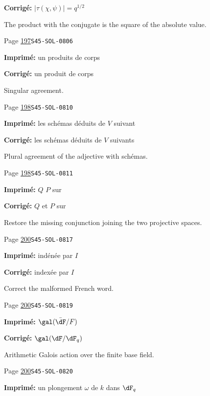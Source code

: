 \begin{description}
\par\noindent\textbf{Corrigé:} \(|\tau(\chi,\psi)|=q^{1/2}\)
\par\noindent The product with the conjugate is the square of the absolute value.
\smallskip
\item[\hypertarget{apparatus:FR-0177}{177}] Page \hyperlink{printpage:fr:197}{197}\quad\texttt{S45-SOL-0806}
\par\noindent\textbf{Imprimé:} un produits de corps
\par\noindent\textbf{Corrigé:} un produit de corps
\par\noindent Singular agreement.
\smallskip
\item[\hypertarget{apparatus:FR-0178}{178}] Page \hyperlink{printpage:fr:198}{198}\quad\texttt{S45-SOL-0810}
\par\noindent\textbf{Imprimé:} les schémas déduits de $V$ suivant
\par\noindent\textbf{Corrigé:} les schémas déduits de $V$ suivants
\par\noindent Plural agreement of the adjective with schémas.
\smallskip
\item[\hypertarget{apparatus:FR-0179}{179}] Page \hyperlink{printpage:fr:198}{198}\quad\texttt{S45-SOL-0811}
\par\noindent\textbf{Imprimé:} $Q$ $P$ sur
\par\noindent\textbf{Corrigé:} $Q$ et $P$ sur
\par\noindent Restore the missing conjunction joining the two projective spaces.
\smallskip
\item[\hypertarget{apparatus:FR-0180}{180}] Page \hyperlink{printpage:fr:200}{200}\quad\texttt{S45-SOL-0817}
\par\noindent\textbf{Imprimé:} indénée par $I$
\par\noindent\textbf{Corrigé:} indexée par $I$
\par\noindent Correct the malformed French word.
\smallskip
\item[\hypertarget{apparatus:FR-0181}{181}] Page \hyperlink{printpage:fr:200}{200}\quad\texttt{S45-SOL-0819}
\par\noindent\textbf{Imprimé:} \(\gal(\bar\dF/F)\)
\par\noindent\textbf{Corrigé:} \(\gal(\dF/\dF_q)\)
\par\noindent Arithmetic Galois action over the finite base field.
\smallskip
\item[\hypertarget{apparatus:FR-0182}{182}] Page \hyperlink{printpage:fr:200}{200}\quad\texttt{S45-SOL-0820}
\par\noindent\textbf{Imprimé:} un plongement $\omega$ de $k$ dans $\dF_q$

\end{description}
